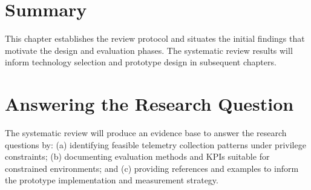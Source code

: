 \section{Summary}
This chapter establishes the review protocol and situates the initial findings that motivate the design and evaluation phases. The systematic review results will inform technology selection and prototype design in subsequent chapters.

\section{Answering the Research Question}
The systematic review will produce an evidence base to answer the research questions by: (a) identifying feasible telemetry collection patterns under privilege constraints; (b) documenting evaluation methods and KPIs suitable for constrained environments; and (c) providing references and examples to inform the prototype implementation and measurement strategy.